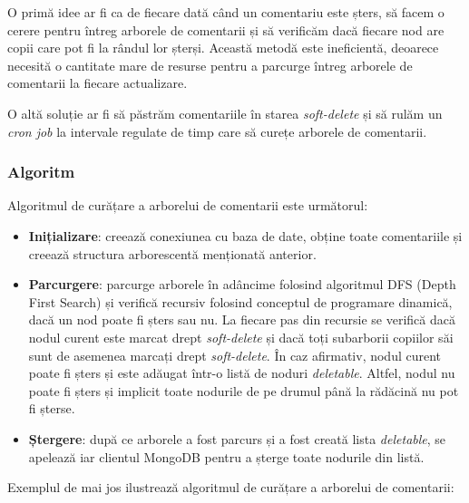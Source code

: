\par
O primă idee ar fi ca de fiecare dată când un comentariu este șters, să facem o cerere pentru întreg arborele
de comentarii și să verificăm dacă fiecare nod are copii care pot fi la rândul lor șterși. Această metodă
este ineficientă, deoarece necesită o cantitate mare de resurse pentru a parcurge întreg arborele de comentarii
la fiecare actualizare.

\par
O altă soluție ar fi să păstrăm comentariile în starea \textit{soft-delete} și să rulăm un \textit{cron job}
la intervale regulate de timp care să curețe arborele de comentarii. 

\subsubsection{Algoritm}
\par
Algoritmul de curățare a arborelui de comentarii este următorul:

\begin{itemize}
    \item \textbf{Inițializare}: creează conexiunea cu baza de date, obține toate comentariile și creează
    structura arborescentă menționată anterior.
    \item \textbf{Parcurgere}: parcurge arborele în adâncime folosind algoritmul DFS (Depth First Search) și
    verifică recursiv folosind conceptul de programare dinamică, dacă un nod poate fi șters sau nu. La fiecare
    pas din recursie se verifică dacă nodul curent este marcat drept \textit{soft-delete} și dacă toți
    subarborii copiilor săi sunt de asemenea marcați drept \textit{soft-delete}. În caz afirmativ, nodul
    curent poate fi șters și este adăugat într-o listă de noduri \textit{deletable}. Altfel, nodul nu poate
    fi șters și implicit toate nodurile de pe drumul până la rădăcină nu pot fi șterse.
    \item \textbf{Ștergere}: după ce arborele a fost parcurs și a fost creată lista \textit{deletable}, se
    apelează iar clientul MongoDB pentru a șterge toate nodurile din listă.
\end{itemize}

\par
Exemplul de mai jos ilustrează algoritmul de curățare a arborelui de comentarii:

\vspace{2em}


